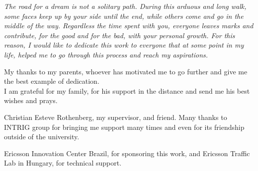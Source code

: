 

\tableofcontents*
\cleardoublepage

\begin{dedicatoria}
    \vspace*{\fill}
    \centering
    \noindent
    \textit{The road for a dream is not a solitary path. During this arduous and long walk, some faces keep up by your side until the end, while others come and go in the middle of the way. Regardless the time spent with you, everyone leaves marks and contribute, for the good and for the bad, with your personal growth. For this reason, I would like to dedicate this work to everyone that at some point in my life, helped me to go through this process and reach my aspirations.} 
    
    \vspace*{\fill}
\end{dedicatoria}

\begin{agradecimentos}
   
My thanks to my parents, whoever has motivated me to go further and give me the best example of dedication. \\
I am grateful for my family, for his support in the distance and send me his best wishes and prays.

Christian Esteve Rothenberg, my supervisor, and friend.
Many thanks to INTRIG group for bringing me support many times and even for its friendship outside of the university.

Ericsson Innovation Center Brazil, for sponsoring this work, and Ericsson Traffic Lab in Hungary, for technical support.

    


    
    
\end{agradecimentos}

